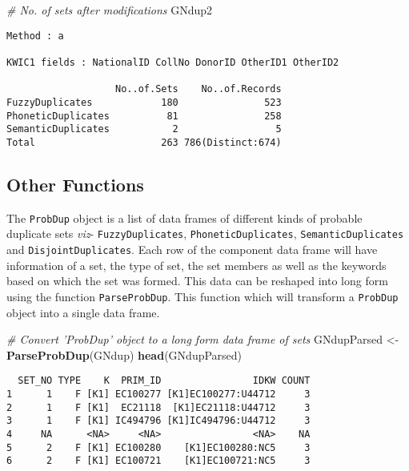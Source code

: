 \documentclass[]{article}
\newenvironment{Shaded}{\begin{snugshade}}{\end{snugshade}}
\newcommand{\CommentTok}[1]{\textcolor[rgb]{0.56,0.35,0.01}{\textit{#1}}}
\newcommand{\KeywordTok}[1]{\textcolor[rgb]{0.13,0.29,0.53}{\textbf{#1}}}
\newcommand{\NormalTok}[1]{#1}
\newcommand{\StringTok}[1]{\textcolor[rgb]{0.31,0.60,0.02}{#1}}
\begin{document}
\begin{Shaded}
\begin{Highlighting}[]
\CommentTok{# No. of sets after modifications}
\NormalTok{GNdup2}
\end{Highlighting}
\end{Shaded}

\begin{verbatim}
Method : a

KWIC1 fields : NationalID CollNo DonorID OtherID1 OtherID2
 
                   No..of.Sets    No..of.Records
FuzzyDuplicates            180               523
PhoneticDuplicates          81               258
SemanticDuplicates           2                 5
Total                      263 786(Distinct:674)
\end{verbatim}

\hypertarget{other-functions}{%
\subsection{Other Functions}\label{other-functions}}

The \texttt{ProbDup} object is a list of data frames of different kinds
of probable duplicate sets \emph{viz}- \texttt{FuzzyDuplicates},
\texttt{PhoneticDuplicates}, \texttt{SemanticDuplicates} and
\texttt{DisjointDuplicates}. Each row of the component data frame will
have information of a set, the type of set, the set members as well as
the keywords based on which the set was formed. This data can be
reshaped into long form using the function \texttt{ParseProbDup}. This
function which will transform a \texttt{ProbDup} object into a single
data frame.

\begin{Shaded}
\begin{Highlighting}[]
\CommentTok{# Convert 'ProbDup' object to a long form data frame of sets}
\NormalTok{GNdupParsed <-}\StringTok{ }\KeywordTok{ParseProbDup}\NormalTok{(GNdup)}
\KeywordTok{head}\NormalTok{(GNdupParsed)}
\end{Highlighting}
\end{Shaded}

\begin{verbatim}
  SET_NO TYPE    K  PRIM_ID                IDKW COUNT
1      1    F [K1] EC100277 [K1]EC100277:U44712     3
2      1    F [K1]  EC21118  [K1]EC21118:U44712     3
3      1    F [K1] IC494796 [K1]IC494796:U44712     3
4     NA      <NA>     <NA>                <NA>    NA
5      2    F [K1] EC100280    [K1]EC100280:NC5     3
6      2    F [K1] EC100721    [K1]EC100721:NC5     3
\end{verbatim}
\end{document}
